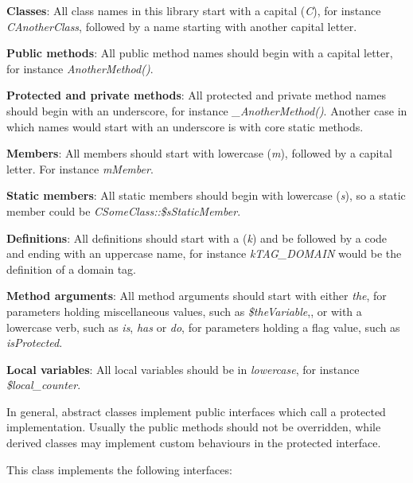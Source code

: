 \begin{DoxyItemize}
\item {\bfseries Classes}\-: All class names in this library start with a capital ({\itshape C}), for instance {\itshape C\-Another\-Class}, followed by a name starting with another capital letter. 
\item {\bfseries Public methods}\-: All public method names should begin with a capital letter, for instance {\itshape Another\-Method()}. 
\item {\bfseries Protected and private methods}\-: All protected and private method names should begin with an underscore, for instance {\itshape \-\_\-\-Another\-Method()}. Another case in which names would start with an underscore is with core static methods. 
\item {\bfseries Members}\-: All members should start with lowercase ({\itshape m}), followed by a capital letter. For instance {\itshape m\-Member}. 
\item {\bfseries Static members}\-: All static members should begin with lowercase ({\itshape s}), so a static member could be {\itshape C\-Some\-Class\-::\$s\-Static\-Member}. 
\item {\bfseries Definitions}\-: All definitions should start with a ({\itshape k}) and be followed by a code and ending with an uppercase name, for instance {\itshape k\-T\-A\-G\-\_\-\-D\-O\-M\-A\-I\-N} would be the definition of a domain tag. 
\item {\bfseries Method arguments}\-: All method arguments should start with either {\itshape the}, for parameters holding miscellaneous values, such as {\itshape \$the\-Variable},, or with a lowercase verb, such as {\itshape is}, {\itshape has} or {\itshape do}, for parameters holding a flag value, such as {\itshape is\-Protected}. 
\item {\bfseries Local variables}\-: All local variables should be in {\itshape lowercase}, for instance {\itshape \$local\-\_\-counter}. 
\end{DoxyItemize}

In general, abstract classes implement public interfaces which call a protected implementation. Usually the public methods should not be overridden, while derived classes may implement custom behaviours in the protected interface.

This class implements the following interfaces\-:


